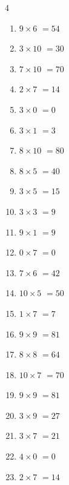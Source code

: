 \begin{multicols}{4}
\begin{enumerate}
  \item $9\times 6$
        $=54$

  \item $3\times 10$
        $=30$

  \item $7\times 10$
        $=70$

  \item $2\times 7$
        $=14$

  \item $3\times 0$
        $=0$

  \item $3\times 1$
        $=3$

  \item $8\times 10$
        $=80$

  \item $8\times 5$
        $=40$

  \item $3\times 5$
        $=15$

  \item $3\times 3$
        $=9$

  \item $9\times 1$
        $=9$

  \item $0\times 7$
        $=0$

  \item $7\times 6$
        $=42$

  \item $10\times 5$
        $=50$

  \item $1\times 7$
        $=7$

  \item $9\times 9$
        $=81$

  \item $8\times 8$
        $=64$

  \item $10\times 7$
        $=70$

\columnbreak %

  \item $9\times 9$
        $=81$

  \item $3\times 9$
        $=27$

  \item $3\times 7$
        $=21$

  \item $4\times 0$
        $=0$

  \item $2\times 7$
        $=14$


\end{enumerate}
\end{multicols}
